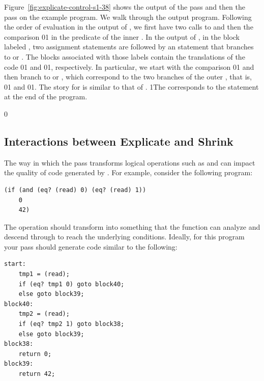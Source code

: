 \documentclass[7x10]{TimesAPriori_MIT}%
\def\racketEd{0}
\def\pythonEd{1}
\def\edition{1}
\newcommand{\racket}[1]{{\if\edition\racketEd{#1}\fi}}
\newcommand{\pythonColor}[0]{}
\newcommand{\python}[1]{{\if\edition\pythonEd\pythonColor #1\fi}}
\numberwithin{theorem}{chapter}
\numberwithin{definition}{chapter}
\numberwithin{equation}{chapter}
\begin{document}
Figure~\ref{fig:explicate-control-s1-38} shows the output of the
 pass and then the
 pass on the example program. We walk through
the output program.
%
Following the order of evaluation in the output of
, we first have two calls to \CREAD{}
and then the comparison \racket{}\python{}
in the predicate of the inner .  In the output of
, in the
block labeled , two assignment statements are followed by an
 statement that branches to  or
. The blocks associated with those labels contain the
translations of the code
\racket{}\python{}
and
\racket{}\python{},
respectively.  In particular, we start  with the
comparison
\racket{}\python{}
and then branch to  or ,
which correspond to the two branches of the outer , that is,
\racket{}\python{} and
\racket{}\python{}.
%
The story for  is similar to that of .
%
\python{The  corresponds to the  statement
  at the end of the program.}


{\if\edition\racketEd

\subsection{Interactions between Explicate and Shrink}
  
The way in which the  pass transforms logical operations
such as  and  can impact the quality of code
generated by . For example, consider the
following program:
\begin{lstlisting}
(if (and (eq? (read) 0) (eq? (read) 1))
    0
    42)  
\end{lstlisting}
The  operation should transform into something that the
 function can analyze and descend through to
reach the underlying  conditions. Ideally, for this program
your  pass should generate code similar to
the following:
\begin{center}
\begin{minipage}{\textwidth}
\begin{lstlisting}
start:
    tmp1 = (read);
    if (eq? tmp1 0) goto block40;
    else goto block39;
block40:
    tmp2 = (read);
    if (eq? tmp2 1) goto block38;
    else goto block39;
block38:
    return 0;
block39:
    return 42;
\end{lstlisting}
\end{minipage}
\end{center}
\fi}
\end{document}
